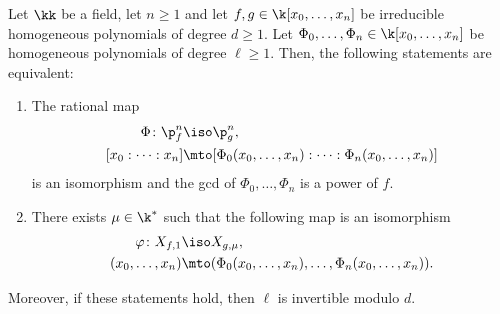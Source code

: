 \begin{proposition}
\label{Prop.cyclic_covering}
Let $\kk$ be a field, let $n \geq 1$ and let $f,g\in \k[x_0,\ldots,x_n]$ be irreducible homogeneous polynomials
of degree $d \ge 1$. Let $\Phi_0,\ldots,\Phi_n\in \k[x_0,\ldots,x_n]$ be homogeneous polynomials of degree $\ell\ge 1$.
Then, the following statements are equivalent:
\begin{enumerate}
\item\label{cyclic_covering1} The rational map
\begin{align*}
\Phi\colon \p^n_f & \iso  \p^n_g, \\
{[x_0:\cdots:x_n]} & \mto  [\Phi_0(x_0,\ldots,x_n):\cdots: \Phi_n(x_0,\ldots,x_n)]
\end{align*}
is an isomorphism and the gcd of $\Phi_0, \ldots, \Phi_n$ is a power of $f$.
\item\label{cyclic_covering2}There exists $\mu\in \k^*$ such that the following map is an isomorphism
\begin{align*}
\varphi\colon X_{f,1} & \iso X_{g,\mu}, \\
(x_0,\ldots,x_n) & \mto (\Phi_0(x_0,\ldots,x_n),\ldots, \Phi_n(x_0,\ldots,x_n)).
\end{align*}
\end{enumerate}
Moreover, if these statements hold, then $\ell$ is invertible modulo $d$.
\end{proposition}
